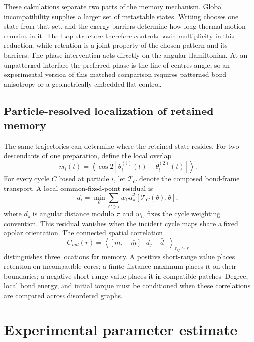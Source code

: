 \documentclass[aps,prl,onecolumn,superscriptaddress,nofootinbib]{revtex4-2}
\begin{document}
These calculations separate two parts of the memory mechanism. Global
incompatibility supplies a larger set of metastable states. Writing chooses
one state from that set, and the energy barriers determine how long thermal
motion remains in it. The loop structure therefore controls basin multiplicity
in this reduction, while retention is a joint property of the chosen pattern
and its barriers. The phase intervention acts directly on the angular
Hamiltonian. At an unpatterned interface the preferred phase is the
line-of-centres angle, so an experimental version of this matched comparison
requires patterned bond anisotropy or a geometrically embedded flat control.

\subsection{Particle-resolved localization of retained memory}

The same trajectories can determine where the retained state resides. For
two descendants of one preparation, define the local overlap
\begin{equation}
 m_i(t)=\left\langle
 \cos 2[\theta_i^{(1)}(t)-\theta_i^{(2)}(t)]
 \right\rangle .
 \label{eq:supp-local-memory}
\end{equation}
For every cycle \(C\) based at particle \(i\), let \(\mathcal T_C\) denote the
composed bond-frame transport. A local common-fixed-point residual is
\begin{equation}
 d_i=\min_{\theta}\sum_{C\ni i}w_C
 d_\pi^2[\mathcal T_C(\theta),\theta],
 \label{eq:supp-local-incompatibility}
\end{equation}
where \(d_\pi\) is angular distance modulo \(\pi\) and \(w_C\) fixes the cycle
weighting convention. This residual vanishes when the incident cycle maps
share a fixed apolar orientation. The connected spatial correlation
\begin{equation}
 C_{md}(r)=\left\langle
 [m_i-\bar m][d_j-\bar d]
 \right\rangle_{r_{ij}\simeq r}
 \label{eq:supp-memory-defect-correlation}
\end{equation}
distinguishes three locations for memory. A positive short-range value places
retention on incompatible cores; a finite-distance maximum places it on their
boundaries; a negative short-range value places it in compatible patches.
Degree, local bond energy, and initial torque must be conditioned when these
correlations are compared across disordered graphs.

\section{Experimental parameter estimate}
\end{document}
